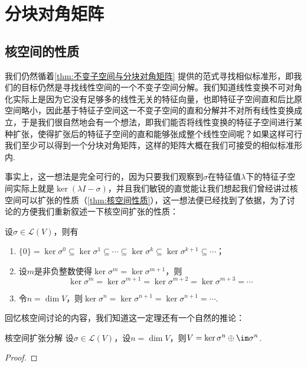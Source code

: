 \section{分块对角矩阵}

\subsection{核空间的性质}

我们仍然循着\autoref{thm:不变子空间与分块对角矩阵} 提供的范式寻找相似标准形，即我们的目标仍然是寻找线性空间的一个不变子空间分解。我们知道线性变换不可对角化实际上是因为它没有足够多的线性无关的特征向量，也即特征子空间直和后比原空间略小，因此基于特征子空间这一不变子空间的直和分解并不对所有线性变换成立，于是我们很自然地会有一个想法，即我们能否将线性变换的特征子空间进行某种扩张，使得扩张后的特征子空间的直和能够张成整个线性空间呢？如果这样可行我们至少可以得到一个分块对角矩阵，这样的矩阵大概在我们可接受的相似标准形内.

事实上，这一想法是完全可行的，因为只要我们观察到$\sigma$在特征值$\lambda$下的特征子空间实际上就是$\ker(\lambda I-\sigma)$，并且我们敏锐的直觉能让我们想起我们曾经讲过核空间可以扩张的性质（\autoref{thm:核空间性质}），这一想法便已经找到了依据，为了讨论的方便我们重新叙述一下核空间扩张的性质：
\begin{theorem}{}{}
    设$\sigma\in \mathcal{L}(V)$，则有
    \begin{enumerate}
        \item $\{0\}=\ker \sigma^0\subseteq\ker \sigma^1\subseteq\cdots\subseteq\ker \sigma^k\subseteq\ker \sigma^{k+1}\subseteq\cdots$；

        \item 设$m$是非负整数使得$\ker \sigma^m=\ker \sigma^{m+1}$，则
              \[\ker \sigma^m=\ker \sigma^{m+1}=\ker \sigma^{m+2}=\ker \sigma^{m+3}=\cdots\]

        \item 令$n=\dim V$，则$\ker \sigma^n=\ker \sigma^{n+1}=\ker \sigma^{n+1}=\cdots$.
    \end{enumerate}
\end{theorem}

回忆核空间讨论的内容，我们知道这一定理还有一个自然的推论：
\begin{theorem}{}{核空间扩张分解}
    设$\sigma\in\mathcal{L}(V)$，设$n=\dim V$，则$V=\ker \sigma^n\oplus \im \sigma^n$.
\end{theorem}
\begin{proof}

\end{proof}

